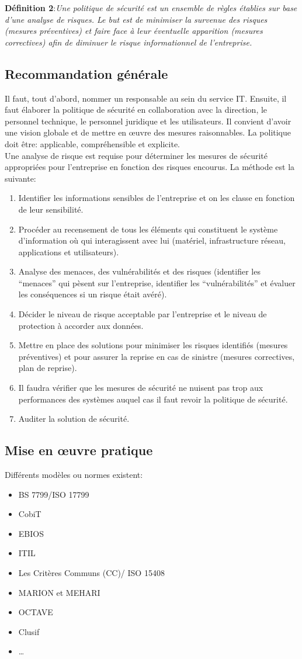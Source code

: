 \documentclass[10pt,a4paper,oneside,titlepage]{report}
\begin{document}
\noindent
\textbf{Définition 2}:\emph{Une politique de sécurité est un ensemble de règles
établies sur base d’une analyse de risques. Le but est de minimiser la survenue
des risques (mesures préventives) et faire face à leur éventuelle apparition
(mesures correctives) afin de diminuer le risque informationnel de
l’entreprise.}

\subsection{Recommandation générale}
Il faut, tout d'abord, nommer un responsable au sein du service IT. Ensuite,
il faut élaborer la politique de sécurité en collaboration avec la direction,
le personnel technique, le personnel juridique et les utilisateurs. Il convient
d'avoir une vision globale et de mettre en œuvre des mesures raisonnables.
La politique doit être: applicable, compréhensible et explicite.\\

Une analyse de risque est requise pour déterminer les mesures de sécurité
appropriées pour l’entreprise en fonction des risques encourus. La méthode est
la suivante:
\begin{enumerate}
\item Identifier les informations sensibles de l’entreprise et on les classe en
fonction de leur sensibilité.
\item Procéder au recensement de tous les éléments qui constituent le système
d’information où qui interagissent avec lui (matériel, infrastructure réseau,
applications et utilisateurs).
\item Analyse des menaces, des vulnérabilités et des risques (identifier les
``menaces'' qui pèsent sur l’entreprise, identifier les ``vulnérabilités''
et évaluer les conséquences si un risque était avéré).
\item Décider le niveau de risque acceptable par l’entreprise et le niveau de
protection à accorder aux données.
\item Mettre en place des solutions pour minimiser les risques identifiés
(mesures préventives) et pour assurer la reprise en cas de sinistre (mesures
correctives, plan de reprise).
\item Il faudra vérifier que les mesures de sécurité ne nuisent pas trop aux
performances des systèmes auquel cas il faut revoir la politique de sécurité.
\item Auditer la solution de sécurité.
\end{enumerate}

\subsection{Mise en œuvre pratique}
Différents modèles ou normes existent:
\begin{itemize}
\item BS 7799/ISO 17799
\item CobiT
\item EBIOS
\item ITIL
\item Les Critères Communs (CC)/ ISO 15408
\item MARION et MEHARI
\item OCTAVE
\item Clusif
\item \dots
\end{itemize}
\end{document}
